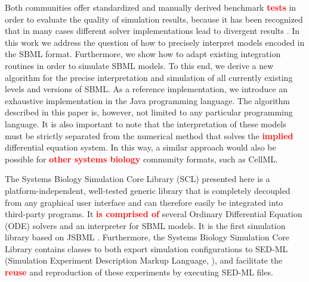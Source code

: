 \documentclass[10pt]{bmc_article}
\newenvironment{bmcformat}{\baselineskip20pt\sloppy\setboolean{publ}{false}}{\baselineskip20pt\sloppy}
\newcommand{\TODO}[1]{\textcolor{red}{\textbf{#1}}}
\begin{document}
\begin{bmcformat}
Both communities offer standardized and manually derived benchmark \TODO{tests} in order
to evaluate the quality of simulation results, because it has been recognized
that in many cases different solver implementations lead to divergent results
\cite{Bergmann2008}.
In this work we address the question of how to precisely interpret models
encoded in the SBML format. Furthermore, we show how to adapt existing
integration routines in order to simulate SBML models.
To this end, we derive a new algorithm for the precise interpretation and 
simulation of all currently existing levels and versions of SBML.
As a reference implementation, we introduce an exhaustive implementation in the
Java\texttrademark{} programming language. The algorithm described in this paper
is, however, not limited to any particular programming language. It is also
important to note that the interpretation of these models must be strictly
separated from the numerical method that solves the \TODO{implied} differential
equation system. In this way, a similar approach would also be possible for
\TODO{other systems biology} community formats, such as CellML.


%
%
%
%
The Systems Biology Simulation Core Library (SCL) presented here is a platform-independent,
well-tested generic library that is completely decoupled from any graphical
user interface and can therefore easily be integrated into third-party programs.
It \TODO{is comprised of} several Ordinary Differential Equation (ODE)
solvers and an interpreter for SBML models. It is the first simulation library
based on JSBML \cite{Draeger2011b}. 
%
%
Furthermore, the Systems Biology Simulation Core Library contains classes to both export
simulation configurations to SED-ML (Simulation Experiment Description Markup Language,
\cite{Waltemath2011}), and facilitate the \TODO{reuse} and reproduction of these
experiments by executing SED-ML files.


\end{bmcformat}
\end{document}
